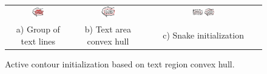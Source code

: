 	\begin{figure}[!ht]%
	\begin{center}
	  \begin{tabular}{ccc}
	  \includegraphics[trim= 0mm 0mm 0mm 0mm, clip, width=0.20\textwidth]{group_lines.png}&
	  \includegraphics[trim= 0mm 0mm 0mm 0mm, clip, width=0.20\textwidth]{convex_hull.png}&
	  \includegraphics[trim= 48mm 0mm 0mm 0mm, clip, width=0.20\textwidth]{snake_init.png} \\ 
	  \footnotesize a) Group of text lines	& \footnotesize b) Text area convex hull 	& \footnotesize c) Snake initialization 
	  \end{tabular}
	\caption[Active contour initialization based on text region convex hull]{Active contour initialization based on text region convex hull.}
		\label{fig:se:paragraphs}
	\end{center}
	\end{figure}	



